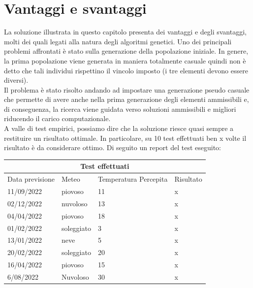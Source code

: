 \documentclass[a4paper, 11pt, oneside]{report}
\begin{document}
            \section{Vantaggi e svantaggi}
            La soluzione illustrata in questo capitolo presenta dei vantaggi e degli svantaggi, molti dei quali legati
            alla natura degli algoritmi genetici.
            Uno dei principali problemi affrontati è stato sulla generazione della popolazione iniziale.
            In genere, la prima popolazione viene generata in maniera totalmente casuale quindi non è detto che
            tali individui rispettino il vincolo imposto (i tre elementi devono essere diversi).\\
            Il problema è stato risolto andando ad impostare una generazione pseudo casuale che permette
            di avere anche nella prima generazione degli elementi ammissibili e, di conseguenza,
            la ricerca viene guidata verso soluzioni ammissibili e migliori riducendo il carico computazionale.\\
            A valle di test empirici, possiamo dire che la soluzione riesce quasi sempre a restituire un risultato ottimale.
            In particolare, su 10 test effettuati ben x volte il risultato è da considerare ottimo.
            Di seguito un report del test eseguito:
            \begin{center}
                \begin{tabular}{ |p{3cm}|p{2cm}|p{2cm}||p{4cm}|}
                    \hline
                    \multicolumn{4}{|c|}{Test effettuati} \\
                    \hline
                    Data previsione & Meteo & Temperatura Percepita & Risultato\\
                    \hline
                    11/09/2022 & piovoso  & 11 & x\\
                    \hline
                    02/12/2022 & nuvoloso  & 13 & x\\
                    \hline
                    04/04/2022 & piovoso  & 18 & x\\
                    \hline
                    01/02/2022 & soleggiato  & 3 & x\\
                    \hline
                    13/01/2022 & neve  & 5 & x\\
                    \hline
                    20/02/2022 & soleggiato  & 20 & x\\
                    \hline
                    16/04/2022 & piovoso  & 15 & x\\
                    \hline
                    6/08/2022 & Nuvoloso  & 30 & x\\
                    \hline
                \end{tabular}
            \end{center}
\end{document}
